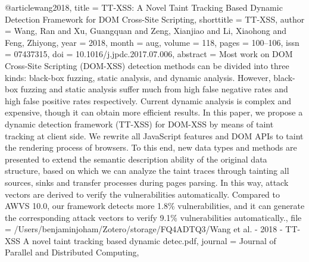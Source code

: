 @article{wang2018,
  title = {{{TT}}-{{XSS}}: {{A}} Novel Taint Tracking Based Dynamic Detection Framework for {{DOM Cross}}-{{Site Scripting}}},
  shorttitle = {{{TT}}-{{XSS}}},
  author = {Wang, Ran and Xu, Guangquan and Zeng, Xianjiao and Li, Xiaohong and Feng, Zhiyong},
  year = {2018},
  month = aug,
  volume = {118},
  pages = {100--106},
  issn = {07437315},
  doi = {10.1016/j.jpdc.2017.07.006},
  abstract = {Most work on DOM Cross-Site Scripting (DOM-XSS) detection methods can be divided into three kinds: black-box fuzzing, static analysis, and dynamic analysis. However, black-box fuzzing and static analysis suffer much from high false negative rates and high false positive rates respectively. Current dynamic analysis is complex and expensive, though it can obtain more efficient results. In this paper, we propose a dynamic detection framework (TT-XSS) for DOM-XSS by means of taint tracking at client side. We rewrite all JavaScript features and DOM APIs to taint the rendering process of browsers. To this end, new data types and methods are presented to extend the semantic description ability of the original data structure, based on which we can analyze the taint traces through tainting all sources, sinks and transfer processes during pages parsing. In this way, attack vectors are derived to verify the vulnerabilities automatically. Compared to AWVS 10.0, our framework detects more 1.8\% vulnerabilities, and it can generate the corresponding attack vectors to verify 9.1\% vulnerabilities automatically.},
  file = {/Users/benjaminjoham/Zotero/storage/FQ4ADTQ3/Wang et al. - 2018 - TT-XSS A novel taint tracking based dynamic detec.pdf},
  journal = {Journal of Parallel and Distributed Computing},
}



